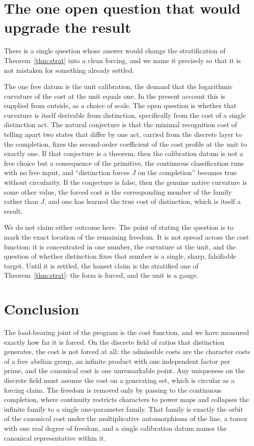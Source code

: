 \documentclass[11pt,a4paper]{article}
\theoremstyle{definition}
\theoremstyle{remark}
\begin{document}
\section{The one open question that would upgrade the result}\label{sec:open}

There is a single question whose answer would change the stratification of
Theorem~\ref{thm:strat} into a clean forcing, and we name it precisely so that it
is not mistaken for something already settled.

The one free datum is the unit calibration, the demand that the logarithmic
curvature of the cost at the unit equals one. In the present account this is
supplied from outside, as a choice of scale. The open question is whether that
curvature is itself derivable from distinction, specifically from the cost of a
single distinction act. The natural conjecture is that the minimal recognition
cost of telling apart two states that differ by one act, carried from the
discrete layer to the completion, fixes the second-order coefficient of the cost
profile at the unit to exactly one. If that conjecture is a theorem, then the
calibration datum is not a free choice but a consequence of the primitive, the
continuous classification runs with no free input, and ``distinction forces $J$ on
the completion'' becomes true without circularity. If the conjecture is false,
then the genuine native curvature is some other value, the forced cost is the
corresponding member of the family rather than $J$, and one has learned the true
cost of distinction, which is itself a result.

We do not claim either outcome here. The point of stating the question is to mark
the exact location of the remaining freedom. It is not spread across the cost
function; it is concentrated in one number, the curvature at the unit, and the
question of whether distinction fixes that number is a single, sharp, falsifiable
target. Until it is settled, the honest claim is the stratified one of
Theorem~\ref{thm:strat}: the form is forced, and the unit is a gauge.

\section{Conclusion}

The load-bearing joint of the program is the cost function, and we have measured
exactly how far it is forced. On the discrete field of ratios that distinction
generates, the cost is not forced at all: the admissible costs are the character
costs of a free abelian group, an infinite product with one independent factor
per prime, and the canonical cost is one unremarkable point. Any uniqueness on the
discrete field must assume the cost on a generating set, which is circular as a
forcing claim. The freedom is removed only by passing to the continuous
completion, where continuity restricts characters to power maps and collapses the
infinite family to a single one-parameter family. That family is exactly the orbit
of the canonical cost under the multiplicative automorphisms of the line, a torsor
with one real degree of freedom, and a single calibration datum names the
canonical representative within it.
\end{document}
